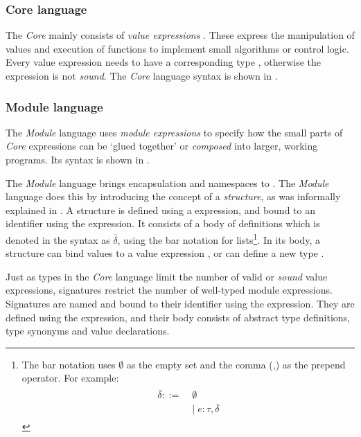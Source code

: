 \subsubsection{Core language}
The \emph{Core} mainly consists of \emph{value expressions} . 
These express the manipulation of values and execution of functions to implement small algorithms or control logic.
Every value expression  needs to have a corresponding type \cmath{\tau}, otherwise the expression is not \emph{sound}.
The \emph{Core} language syntax is shown in .



\subsubsection{Module language}
The \emph{Module} language uses \emph{module expressions}  to specify how the small parts of \emph{Core} expressions can be `glued together' or \emph{composed} into larger, working programs.
Its syntax is shown in .

The \emph{Module} language brings encapsulation and namespaces to \MiniML.
The \emph{Module} language does this by introducing the concept of a \emph{structure}, as was informally explained in .
A structure is defined using a  expression, and bound to an identifier  using the  expression.
It consists of a body of definitions which is denoted in the syntax as $\overline{\mathit{\delta}}$, using the bar notation for lists\footnote{
The bar notation uses $\emptyset$ as the empty set and the comma (,) as the prepend operator.
For example: \begin{align*}
\begin{aligned}
\overline{\delta} ::=\; &\emptyset \\ 
&|\;e:\tau,\overline{\delta}
\end{aligned}
\end{align*}
}.
In its body, a structure  can bind values  to a value expression , or can define a new type .

Just as types in the \emph{Core} language limit the number of valid or \emph{sound} value expressions, signatures restrict the number of well-typed module expressions.
Signatures are named and bound to their identifier using the  expression. 
They are defined using the  expression, and their body consists of abstract type definitions, type synonyms and value declarations.


